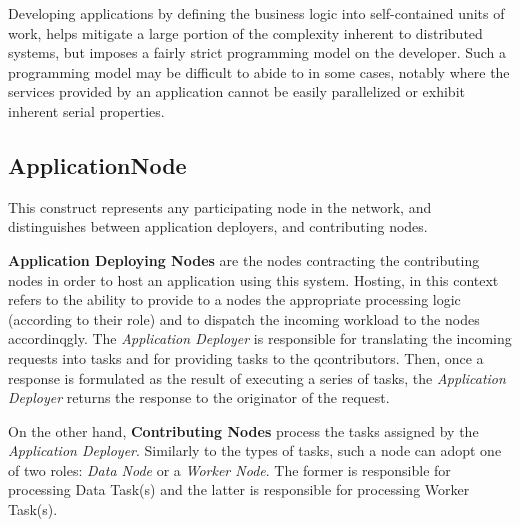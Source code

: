 \documentclass[12pt, titlepage]{uo_temp}
\begin{document}
     Developing applications by defining the business logic into self-contained units of
     work, helps mitigate a large portion of the complexity inherent to distributed
     systems, but imposes a fairly strict programming model on the developer. Such a
     programming model may be difficult to abide to in some cases, notably where the
     services provided by an application cannot be easily parallelized or exhibit inherent
     serial properties.

     \subsection{ApplicationNode}
     This construct represents any participating node in the network,
     and distinguishes between application deployers, and contributing nodes.

     \textbf{Application Deploying Nodes} are the nodes contracting the contributing nodes
     in order to host an application using this system. Hosting, in this context refers to
     the ability to provide to a nodes the appropriate processing logic (according to
     their role) and to dispatch the incoming workload to the nodes accordinqgly. The
     \emph{Application Deployer} is responsible for translating the incoming requests into
     tasks and for providing tasks to the qcontributors. Then, once a response is
     formulated as the result of executing a series of tasks, the \emph{Application
       Deployer} returns the response to the originator of the request.

     On the other hand, \textbf{Contributing Nodes} process the tasks assigned by the
     \emph{Application Deployer}. Similarly to the types of tasks, such a node can adopt
     one of two roles: \emph{Data Node} or a \emph{Worker Node}. The former is responsible
     for processing Data Task(s) and the latter is responsible for processing Worker
     Task(s).
    
\end{document}
